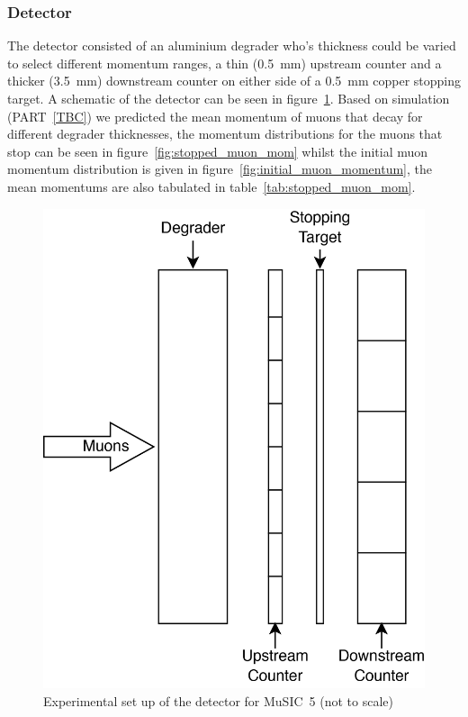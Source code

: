 \subsubsection{Detector} %
\label{sub:detector}
The detector consisted of an aluminium degrader who's thickness could be varied to select different momentum ranges, a thin (0.5~mm) upstream counter and a thicker (3.5~mm) downstream counter on either side of a 0.5~mm copper stopping target. A schematic of the detector can be seen in figure~\ref{fig:m5_setup}. Based on simulation (PART~\ref{TBC}) we predicted the mean momentum of muons that decay for different degrader thicknesses, the momentum distributions for the muons that stop can be seen in figure~\ref{fig:stopped_muon_mom} whilst the initial muon momentum distribution is given in figure~\ref{fig:initial_muon_momentum}, the mean momentums are also tabulated in table~\ref{tab:stopped_muon_mom}.
\begin{figure}[htbp]
    \centering
        \includegraphics[scale=0.5]{images/momentum_spectrum/Detector_setup_music5.png}
    \caption{Experimental set up of the detector for MuSIC~5 (not to scale)}
    \label{fig:m5_setup}
\end{figure}  

